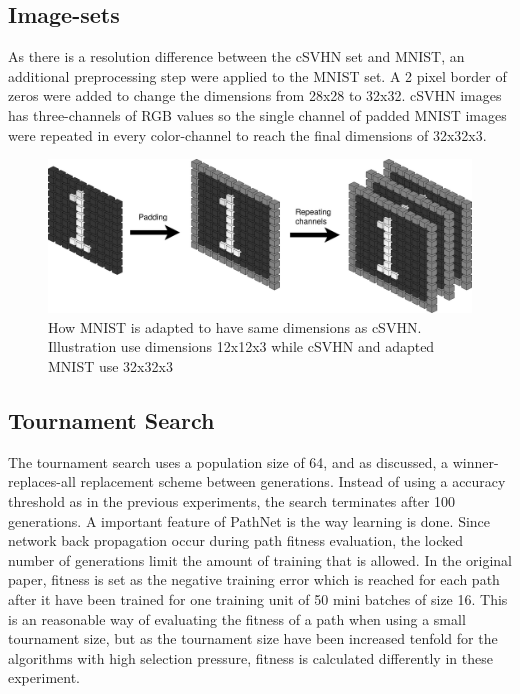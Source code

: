 \subsection{Image-sets}
As there is a resolution difference between the cSVHN set and MNIST, an additional preprocessing step were applied to the MNIST set. A 2 pixel border of zeros were added to change the dimensions from 28x28 to 32x32. cSVHN images has three-channels of RGB values so the single channel of padded MNIST images were repeated in every color-channel to reach the final dimensions of 32x32x3.  

\begin{figure}[ht]
    \includegraphics[width=\textwidth]{Chapters/4.Experiments/exp2/figures/MNISTpadding+repeating.png}
    \caption[MNIST modifications]{How MNIST is adapted to have same dimensions as cSVHN. Illustration use dimensions 12x12x3 while cSVHN and adapted MNIST use 32x32x3}
    \label{fig:MNISTpadding}
\end{figure}

\subsection{Tournament Search}\label{exp2:implementation.search}
The tournament search uses a population size of 64, and as discussed, a winner-replaces-all replacement scheme between generations. Instead of using a accuracy threshold as in the previous experiments, the search terminates after 100 generations. A important feature of PathNet is the way learning is done. Since network back propagation occur during path fitness evaluation, the locked number of generations limit the amount of training that is allowed. In the original paper, fitness is set as the negative training error which is reached for each path after it have been trained for one training unit of 50 mini batches of size 16. This is an reasonable way of evaluating the fitness of a path when using a small tournament size, but as the tournament size have been increased tenfold for the algorithms with high selection pressure, fitness is calculated differently in these experiment. 

